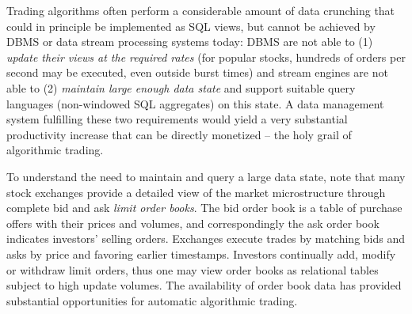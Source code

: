 
Trading algorithms often perform a considerable amount of data crunching that
could in principle be implemented as SQL views, but cannot be achieved by DBMS
or data stream processing systems today: DBMS are not able to (1) {\em update
their views at the required rates}\/ (for popular stocks, hundreds of orders per
second may be executed, even outside burst times) and stream engines are not
able to (2) {\em maintain large enough data state}\/ and support suitable query
languages (non-windowed SQL aggregates) on this state.
A data management system fulfilling these two requirements would yield a very
substantial productivity increase that can be directly monetized -- the holy
grail of algorithmic trading.



To understand the need to maintain and query a large data state, note that
many stock exchanges provide a detailed view of the market microstructure
through complete bid and ask {\em limit order books}. The bid order book is a
table of purchase offers with their prices and volumes, and correspondingly the
ask order book indicates investors' selling orders. Exchanges execute trades by
matching bids and asks by price and favoring earlier timestamps. Investors
continually add, modify or withdraw limit orders, thus one may view order books
as relational tables subject to high update volumes. The availability of order
book data has provided substantial opportunities for automatic algorithmic
trading.





